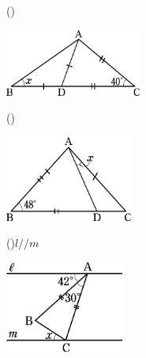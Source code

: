 \documentclass[
  12pt,a4paper,lualatex,ja=standard]{bxjsarticle}
\begin{document}
\begin{flushleft}
\begin{multicols}{2}
\end{multicols}

\vspace{5mm}


\begin{multicols}{2}
()\hspace{2.5pt}

\begin{center}
\def\@captype{figure}
\includegraphics[height=22mm]{media/tu7.jpg}

\end{center}

\columnbreak

()\hspace{2.5pt}

\begin{center}
\def\@captype{figure}
\includegraphics[height=28mm]{media/tu8.jpg}

\end{center}

\end{multicols}

\vspace{5mm}

\begin{multicols}{2}
()\hspace{2.5pt}$l /\!/m$

\begin{center}
\def\@captype{figure}
\includegraphics[height=30mm]{media/tu9.jpg}


\end{center}
\end{multicols}
\end{flushleft}
\end{document}
